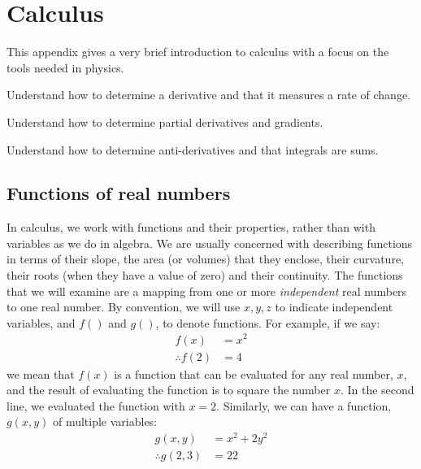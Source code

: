 %
\chapter{Calculus}
\label{app:calculus}
This appendix gives a very brief introduction to calculus with a focus on the tools needed in physics. 
 \vspace{1cm}
\begin{learningObjectives}
{
\item Understand how to determine a derivative and that it measures a rate of change.
\item Understand how to determine partial derivatives and gradients.
\item Understand how to determine anti-derivatives and that integrals are sums.
}
\end{learningObjectives}

\section{Functions of real numbers}
In calculus, we work with functions and their properties, rather than with variables as we do in algebra. We are usually concerned with describing functions in terms of their slope, the area (or volumes) that they enclose, their curvature, their roots (when they have a value of zero) and their continuity. The functions that we will examine are a mapping from one or more \textit{independent} real numbers to one real number. By convention, we will use $x,y,z$ to indicate independent variables, and $f()$ and $g()$, to denote functions. For example, if we say:
\begin{align*}
f(x) &= x^2\\
\therefore f(2) &= 4
\end{align*}
we mean that $f(x)$ is a function that can be evaluated for any real number, $x$, and the result of evaluating the function is to square the number $x$. In the second line, we evaluated the function with $x=2$. Similarly, we can have a function, $g(x,y)$ of multiple variables:
\begin{align*}
g(x,y)&=x^2+2y^2\\
\therefore g(2,3)&=22
\end{align*}

